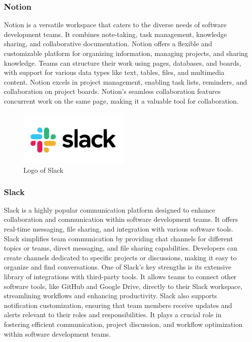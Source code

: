 \documentclass[conference]{IEEEtran}
\begin{document}
        \subsubsection{Notion}
        Notion is a versatile workspace that caters to the diverse needs of software development teams. It combines note-taking, task management, knowledge sharing, and collaborative documentation. Notion offers a flexible and customizable platform for organizing information, managing projects, and sharing knowledge. Teams can structure their work using pages, databases, and boards, with support for various data types like text, tables, files, and multimedia content. Notion excels in project management, enabling task lists, reminders, and collaboration on project boards. Notion's seamless collaboration features concurrent work on the same page, making it a valuable tool for collaboration.\\

        \begin{figure}[htbp]
        \centerline{\includegraphics[width=5.5cm]{Images/logo/slack.png}}
        \label{fig}
        \caption{Logo of Slack}
        \end{figure}
        \subsubsection{Slack}
        Slack is a highly popular communication platform designed to enhance collaboration and communication within software development teams. It offers real-time messaging, file sharing, and integration with various software tools. Slack simplifies team communication by providing chat channels for different topics or teams, direct messaging, and file sharing capabilities. Developers can create channels dedicated to specific projects or discussions, making it easy to organize and find conversations. One of Slack's key strengths is its extensive library of integrations with third-party tools. It allows teams to connect other software tools, like GitHub and Google Drive, directly to their Slack workspace, streamlining workflows and enhancing productivity. Slack also supports notification customization, ensuring that team members receive updates and alerts relevant to their roles and responsibilities. It plays a crucial role in fostering efficient communication, project discussion, and workflow optimization within software development teams.\\
\end{document}
